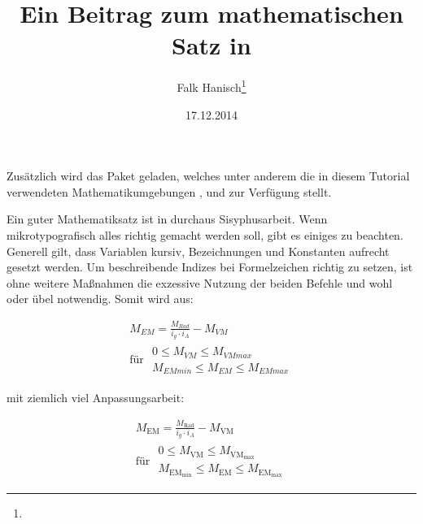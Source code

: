 \documentclass[english,ngerman]{tudscrartcl}
\begin{document}
\date{17.12.2014}
\author{Falk Hanisch\thanks{\noexpand\scriptsize\noexpand\Email{\tudscrmail}}}
\title{Ein Beitrag zum mathematischen Satz in }
\makeatletter
\begingroup%
  \def\and{, }%
  \let\thanks\@gobble%
  \let\footnote\@gobble%
\endgroup%
\markright{\@title}
\makeatother
\StartTutorial
%
%
Zusätzlich wird das Paket  geladen, welches unter anderem die 
in diesem Tutorial verwendeten Mathematikumgebungen , 
 und  zur Verfügung stellt.
%
\begin{Preamble}
\usepackage{amsmath}
\end{Preamble}
%
Ein guter Mathematiksatz ist in  durchaus Sisyphusarbeit. Wenn 
mikrotypografisch alles richtig gemacht werden soll, gibt es einiges zu 
beachten. Generell gilt, dass Variablen kursiv, Bezeichnungen und Konstanten
aufrecht gesetzt werden. Um beschreibende Indizes bei Formelzeichen richtig zu 
setzen, ist ohne weitere Maßnahmen die exzessive Nutzung der beiden Befehle 
\PParameter{\dots} und \PParameter{\dots} wohl oder 
übel notwendig. Somit wird aus:
%
\begin{Trunk*}
\begin{equation*}
\begin{gathered}
M_{EM} =  - M_{VM} \\
\textrm{für }
\begin{aligned}
0\leq M_{VM}\leq M_{VMmax} \\ 
M_{EMmin}\leq M_{EM}\leq M_{EMmax}
\end{aligned}
\end{gathered}
\end{equation*}

\end{Trunk*}
%
mit ziemlich viel Anpassungsarbeit:
%
\begin{Trunk*}
\begin{equation*}
\begin{gathered}
M_ =  - M_ \\
\textrm{für }
\begin{aligned}
0\leq M_\leq M_ \\ 
M_\leq M_\leq M_
\end{aligned}
\end{gathered}
\end{equation*}

\end{Trunk*}
\end{document}
